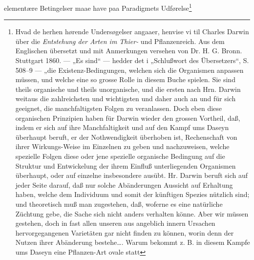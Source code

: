 \documentclass[12pt,a4paper]{book}
\begin{document}
elementære Betingelser maae have paa Paradigmets Udførelse\footnote{Hvad de
herhen hørende Undersøgelser angaaer, henvise vi til Charles Darwin über die
\emph{Entstehung der Arten im Thier-} und Pflanzenreich.
Aus dem Englischen übersetzt und mit Anmerkungen versehen von Dr. H. G. Bronn.
Stuttgart 1860. --- „Es sind“ --- hedder det i „Schlußwort des Übersetzers“,
S. 508--9 --- „die Existenz-Bedingungen, welchen sich die Organismen anpassen
müssen, und welche eine so grosse Rolle in diesem Buche spielen.
Sie sind theils organische und theils unorganische, und die
ersten nach Hrn. Darwin weitaus die zahlreichsten und wichtigsten und daher
auch an und für sich geeignet, die manchfaltigsten Folgen zu veranlassen. Doch
eben diese organischen Prinzipien haben für Darwin wieder den grossen Vortheil,
daß, indem er sich auf ihre Manchfaltigkeit und auf den Kampf ums Daseyn
überhaupt beruft, er der Nothwendigkeit überhoben ist, Rechenschaft von ihrer
Wirkungs-Weise im Einzelnen zu geben und nachzuweisen, welche spezielle Folgen
diese oder jene spezielle organische Bedingung auf die Struktur und
Entwickelung der ihrem Einfluß unterliegenden Organismen überhaupt, oder auf
einzelne insbesondere ausübt. Hr. Darwin beruft sich auf jeder Seite darauf,
daß nur solche Abänderungen Aussicht auf Erhaltung haben, welche dem
Individuum und somit der künftigen Spezies nützlich sind; und theoretisch muß
man zugestehen, daß, woferne es eine natürliche Züchtung gebe, die Sache sich
nicht anders verhalten könne. Aber wir müssen gestehen, doch in fast allen
unseren aus angeblich innern Ursachen hervorgegangenen Varietäten gar nicht
finden zu können, worin denn der Nutzen ihrer Abänderung bestehe\ldots.
Warum bekommt z. B. in diesem Kampfe ums Daseyn eine Pflanzen-Art ovale statt
}
\end{document}
